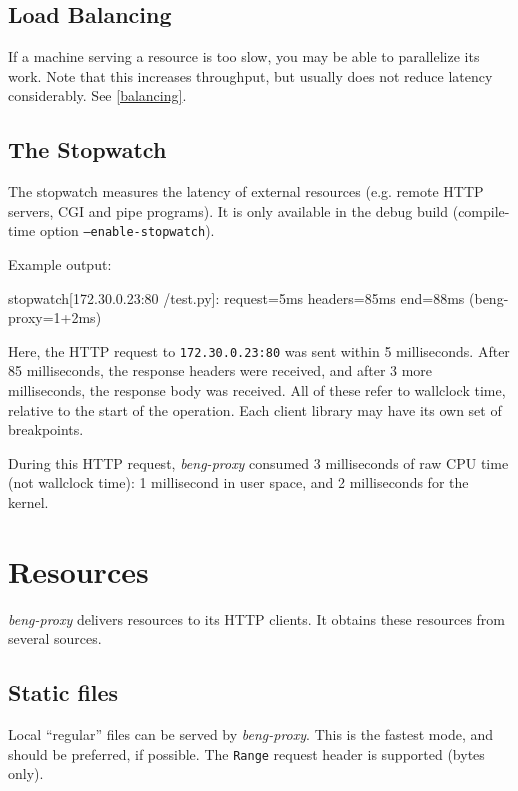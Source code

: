 \documentclass[a4paper,12pt]{article}
\begin{document}
\subsection{Load Balancing}

If a machine serving a resource is too slow, you may be able to
parallelize its work.  Note that this increases throughput, but
usually does not reduce latency considerably.  See \ref{balancing}.

\subsection{The Stopwatch}
\label{stopwatch}

The stopwatch measures the latency of external resources (e.g. remote
HTTP servers, CGI and pipe programs).  It is only available in the
debug build (compile-time option \texttt{--enable-stopwatch}).

Example output:

\begin{verbatim*}
stopwatch[172.30.0.23:80 /test.py]: request=5ms headers=85ms
end=88ms (beng-proxy=1+2ms)
\end{verbatim*}

Here, the HTTP request to \texttt{172.30.0.23:80} was sent within 5
milliseconds.  After 85 milliseconds, the response headers were
received, and after 3 more milliseconds, the response body was
received.  All of these refer to wallclock time, relative to the start
of the operation.  Each client library may have its own set of
breakpoints.

During this HTTP request, \emph{beng-proxy} consumed 3 milliseconds of
raw CPU time (not wallclock time): 1 millisecond in user space, and 2
milliseconds for the kernel.

\section{Resources}

\emph{beng-proxy} delivers resources to its HTTP clients.  It obtains
these resources from several sources.

\subsection{Static files}
\label{static}

Local ``regular'' files can be served by \emph{beng-proxy}.  This is
the fastest mode, and should be preferred, if possible.  The
\texttt{Range} request header is supported (bytes only).
\end{document}
